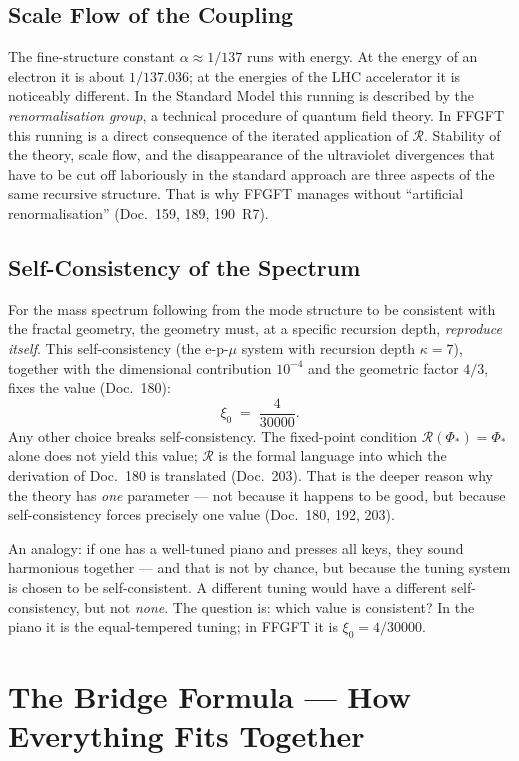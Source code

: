 \subsection*{Scale Flow of the Coupling}
The fine-structure constant $\alpha \approx 1/137$ runs with energy.
At the energy of an electron it is about $1/137{.}036$; at the
energies of the LHC accelerator it is noticeably different. In the
Standard Model this running is described by the
\emph{renormalisation group}, a technical procedure of quantum
field theory. In FFGFT this running is a direct consequence of the
iterated application of $\mathcal{R}$. Stability of the theory,
scale flow, and the disappearance of the ultraviolet divergences
that have to be cut off laboriously in the standard approach are
three aspects of the same recursive structure. That is why FFGFT
manages without \enquote{artificial renormalisation} (Doc.~159, 189,
190~R7).

\subsection*{Self-Consistency of the Spectrum}
For the mass spectrum following from the mode structure to be
consistent with the fractal geometry, the geometry must, at a
specific recursion depth, \emph{reproduce itself}. This
self-consistency (the e-p-$\mu$ system with recursion depth
$\kappa = 7$), together with the dimensional contribution $10^{-4}$
and the geometric factor $4/3$, fixes the value (Doc.~180):
\[
  \xi_0 \;=\; \frac{4}{30000}.
\]
Any other choice breaks self-consistency. The fixed-point condition
$\mathcal{R}(\Phi_*) = \Phi_*$ alone does not yield this value;
$\mathcal{R}$ is the formal language into which the derivation of
Doc.~180 is translated (Doc.~203). That is the deeper reason
why the theory has \emph{one} parameter --- not because it happens
to be good, but because self-consistency forces precisely one value
(Doc.~180, 192, 203).

An analogy: if one has a well-tuned piano and presses all keys, they
sound harmonious together --- and that is not by chance, but because
the tuning system is chosen to be self-consistent. A different
tuning would have a different self-consistency, but not
\emph{none}. The question is: which value is consistent? In the
piano it is the equal-tempered tuning; in FFGFT it is
$\xi_0 = 4/30000$.

\section{The Bridge Formula --- How Everything Fits Together}

